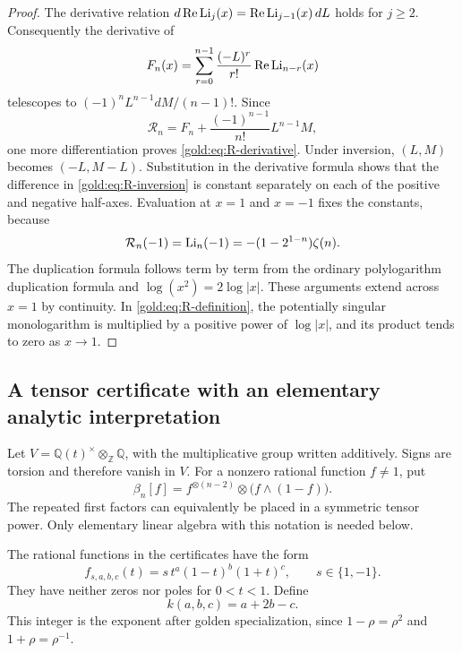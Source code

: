 \begin{proof}
The derivative relation
$d\operatorname{Re}\operatorname{Li}_j(x)=\operatorname{Re}\operatorname{Li}_{j-1}(x)\,dL$
holds for $j\ge2$.  Consequently the derivative of
\[
 F_n(x)=\sum_{r=0}^{n-1}\frac{(-L)^r}{r!}
                      \operatorname{Re}\operatorname{Li}_{n-r}(x)
\]
telescopes to $(-1)^nL^{n-1}dM/(n-1)!$.
Since
\[
 \mathcal R_n=F_n+\frac{(-1)^{n-1}}{n!}L^{n-1}M,
\]
one more differentiation proves \eqref{gold:eq:R-derivative}.
Under inversion, $(L,M)$ becomes $(-L,M-L)$.  Substitution in the
derivative formula shows that the difference in
\eqref{gold:eq:R-inversion} is constant separately on each of the
positive and negative half-axes.  Evaluation at $x=1$ and $x=-1$
fixes the constants, because
\[
 \mathcal R_n(-1)=\operatorname{Li}_n(-1)=-(1-2^{1-n})\zeta(n).
\]
The duplication formula follows term by term from the ordinary
polylogarithm duplication formula and $\log(x^2)=2\log|x|$.
These arguments extend across $x=1$ by continuity.  In
\eqref{gold:eq:R-definition}, the potentially singular monologarithm
is multiplied by a positive power of $\log|x|$, and its product tends
to zero as $x\to1$.
\end{proof}

\subsection{A tensor certificate with an elementary analytic interpretation}

Let $V=\mathbb Q(t)^\times\otimes_{\mathbb Z}\mathbb Q$, with the
multiplicative group written additively.  Signs are torsion and therefore
vanish in $V$.  For a nonzero rational function $f\ne1$, put
\[
 \beta_n[f]=f^{\otimes(n-2)}\otimes\bigl(f\wedge(1-f)\bigr).
\]
The repeated first factors can equivalently be placed in a symmetric
tensor power.  Only elementary linear algebra with this notation is
needed below.

The rational functions in the certificates have the form
\begin{equation}
 f_{s,a,b,c}(t)=s\,t^a(1-t)^b(1+t)^c,
 \qquad s\in\{1,-1\}.
 \label{gold:eq:arguments}
\end{equation}
They have neither zeros nor poles for $0<t<1$.  Define
\begin{equation}
 k(a,b,c)=a+2b-c.
 \label{gold:eq:k}
\end{equation}
This integer is the exponent after golden specialization, since
$1-\rho=\rho^2$ and $1+\rho=\rho^{-1}$.

